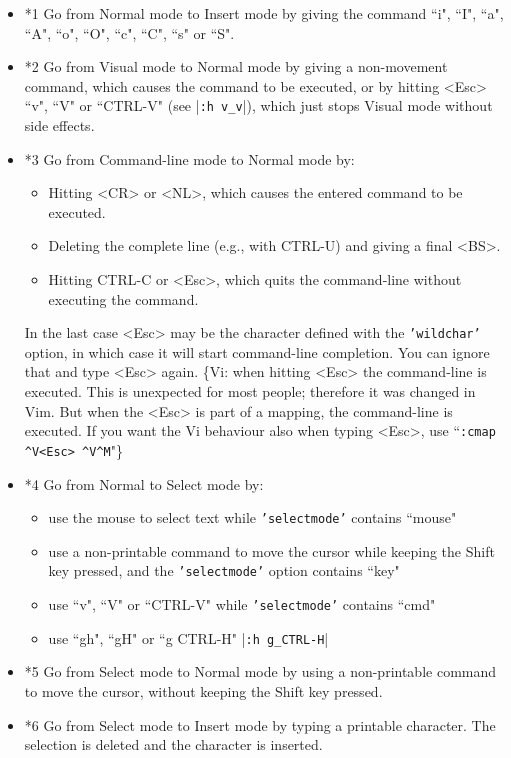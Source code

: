 \begin{itemize}
				\item *1 Go from Normal mode to Insert mode by giving the command ``i", ``I", ``a", ``A", ``o", ``O", ``c", ``C", ``s" or ``S".
				\item *2 Go from Visual mode to Normal mode by giving a non-movement command, which causes the command to be executed, or by hitting <Esc> ``v", ``V" or ``CTRL-V" (see |\texttt{:h v\_v}|), which just stops Visual mode without side effects.
				\item *3 Go from Command-line mode to Normal mode by:
								\begin{itemize}
												\item Hitting <CR> or <NL>, which causes the entered command to be executed.
												\item Deleting the complete line (e.g., with CTRL-U) and giving a final <BS>.
												\item Hitting CTRL-C or <Esc>, which quits the command-line without executing
																the command.
								\end{itemize}
								In the last case <Esc> may be the character defined with the \texttt{'wildchar'} option, in which case it will start command-line completion.
								You can ignore that and type <Esc> again.
								\{Vi: when hitting <Esc> the command-line is executed.
								This is unexpected for most people; therefore it was changed in Vim.
								But when the <Esc> is part of a mapping, the command-line is executed.
								If you want the Vi behaviour also when typing <Esc>, use ``\texttt{:cmap \^{}V<Esc> \^{}V\^{}M}"\}
				\item *4 Go from Normal to Select mode by:
								\begin{itemize}
												\item use the mouse to select text while \texttt{'selectmode'} contains ``mouse"
												\item use a non-printable command to move the cursor while keeping the Shift key pressed, and the \texttt{'selectmode'} option contains ``key"
												\item use ``v", ``V" or ``CTRL-V" while \texttt{'selectmode'} contains ``cmd"
												\item use ``gh", ``gH" or ``g CTRL-H"  |\texttt{:h g\_CTRL-H}|
								\end{itemize}
				\item *5 Go from Select mode to Normal mode by using a non-printable command to move the cursor, without keeping the Shift key pressed.
				\item *6 Go from Select mode to Insert mode by typing a printable character.
								The selection is deleted and the character is inserted.
\end{itemize}

